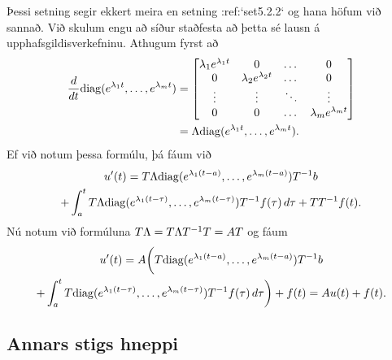 Þessi setning segir ekkert meira en setning :ref:`set5.2.2` og hana höfum
við sannað.  Við skulum engu að síður  staðfesta að þetta sé lausn á
upphafsgildisverkefninu.  Athugum fyrst að
\begin{align*}
\dfrac d{dt}{\operatorname{diag}}(e^{\lambda_1 t},\dots,e^{\lambda_mt})
&=
\left[\begin{matrix}
\lambda_1e\sp{\lambda_1t}&0&\dots&0\\
0&\lambda_2e\sp{\lambda_2t}&\dots&0\\
\vdots&\vdots&\ddots&\vdots\\
0&0&\dots&\lambda_me^{\lambda_mt}
\end{matrix}\right]\\
&=\Lambda{\operatorname{diag}}(e^{\lambda_1 t},\dots,e^{\lambda_mt}).
\end{align*}
Ef við notum þessa formúlu, þá fáum við
 \begin{multline*}
u{\sp{\prime}}(t)=T\Lambda {\operatorname{diag}}(e^{\lambda_1(t-a)},\dots,e^{\lambda_m(t-a)})T^{-1}b
\\
+\int_a^t T\Lambda 
{\operatorname{diag}}(e^{\lambda_1(t-\tau)},\dots,e^{\lambda_m(t-\tau)})T^{-1}f(\tau)\,
d\tau + TT^{-1}f(t).
\end{multline*}
Nú notum við formúluna $T\Lambda =T\Lambda T\sp{-1}T=AT$ og fáum
\begin{multline*}
u{\sp{\prime}}(t)
=A\bigg(T{\operatorname{diag}}(e^{\lambda_1(t-a)},\dots,e^{\lambda_m(t-a)})T^{-1}b \\
+\int_a^t
T{\operatorname{diag}}(e^{\lambda_1(t-\tau)},\dots,e^{\lambda_m(t-\tau)})T^{-1}f(\tau)\, 
d\tau\bigg)+ f(t)=Au(t)+f(t).
\end{multline*}
 

\subsection*{Annars stigs hneppi}


